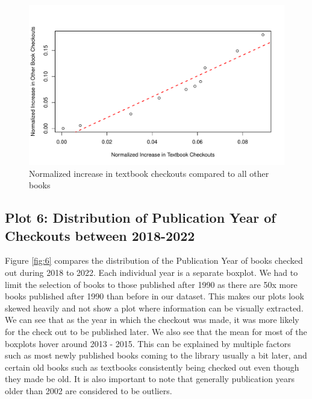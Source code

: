 \documentclass[10pt]{article}\usepackage[]{graphicx}\usepackage[]{xcolor}
\makeatletter
\def\maxwidth{ %
  \ifdim\Gin@nat@width>\linewidth
    \linewidth
  \else
    \Gin@nat@width
  \fi
}
\newenvironment{knitrout}{}{} %
\makeatother
\begin{document}
\begin{figure}[H]
\begin{center}
\begin{knitrout}
\color{fgcolor}
\includegraphics[width=\maxwidth]{figure/plot5-1} 
\end{knitrout}
\end{center}
\caption{Normalized increase in textbook checkouts compared to all other books}\label{fig:5}
\end{figure}

\subsection{Plot 6: Distribution of Publication Year of Checkouts between 2018-2022}

Figure \ref{fig:6} compares the distribution of the Publication Year of books checked out during 2018 to 2022. Each individual year is a separate boxplot. We had to limit the selection of books to those published after 1990 as there are 50x more books published after 1990 than before in our dataset. This makes our plots look skewed heavily and not show a plot where information can be visually extracted. We can see that as the year in which the checkout was made, it was more likely for the check out to be published later. We also see that the mean for most of the boxplots hover around 2013 - 2015. This can be explained by multiple factors such as most newly published books coming to the library usually a bit later, and certain old books such as textbooks consistently being checked out even though they made be old. It is also important to note that generally publication years older than 2002 are considered to be outliers.
\end{document}
